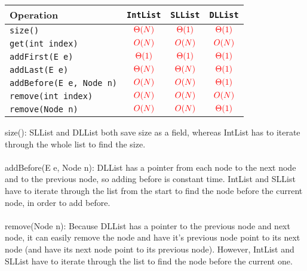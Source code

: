 {
\renewcommand{\arraystretch}{2}
\setlength{\tabcolsep}{16pt}
\begin{tabularx}{\textwidth}{Xccc}
Operation                          & \lstinline$IntList$    & \lstinline$SLList$     & \lstinline$DLList$     \\ \hline
\lstinline$size()$                 & $\color{red}\Theta(N)$ & $\color{red}\Theta(1)$ & $\color{red}\Theta(1)$ \\
\lstinline$get(int index)$         & $\color{red}O(N)$      & $\color{red}O(N)$      & $\color{red}O(N)$      \\
\lstinline$addFirst(E e)$          & $\color{red}\Theta(1)$ & $\color{red}\Theta(1)$ & $\color{red}\Theta(1)$ \\
\lstinline$addLast(E e)$           & $\color{red}\Theta(N)$ & $\color{red}\Theta(N)$ & $\color{red}\Theta(1)$ \\
\lstinline$addBefore(E e, Node n)$ & $\color{red}O(N)$      & $\color{red}O(N)$      & $\color{red}\Theta(1)$ \\
\lstinline$remove(int index)$      & $\color{red}O(N)$      & $\color{red}O(N)$      & $\color{red}O(N)$      \\
\lstinline$remove(Node n)$         & $\color{red}O(N)$      & $\color{red}O(N)$      & $\color{red}\Theta(1)$ \\
\end{tabularx}

\color{red} size(): SLList and DLList both save size as a field, whereas IntList has to iterate through the whole list to find the size. \\\\
addBefore(E e, Node n): DLList has a pointer from each node to the next node and to the previous node, so adding before is constant time. IntList and SLList  have to iterate through the list from the start to find the node before the current node, in order to add before. \\\\
remove(Node n): Because DLList has a pointer to the previous node and next node, it can easily remove the node and have it's previous node point to its next node (and have its next node point to its previous node). However, IntList and SLList have to iterate through the list to find the node before the current one.\\

}
\else
